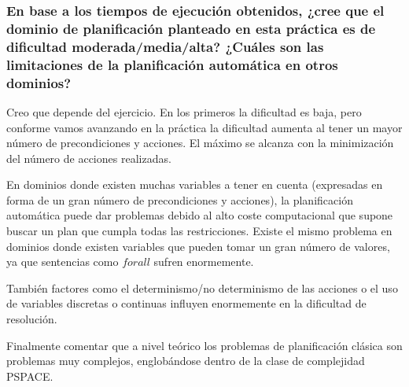 \documentclass[12pt]{article} %
\begin{document}
\subsubsection*{En base a los tiempos de ejecución obtenidos, ¿cree que el dominio de planificación planteado en esta práctica es de dificultad moderada/media/alta? ¿Cuáles son las limitaciones de la planificación automática en otros dominios?}

Creo que depende del ejercicio. En los primeros la dificultad es baja, pero conforme vamos avanzando en la práctica la dificultad aumenta al tener un mayor número de precondiciones y acciones. El máximo se alcanza con la minimización del número de acciones realizadas.

En dominios donde existen muchas variables a tener en cuenta (expresadas en forma de un gran número de precondiciones y acciones), la planificación automática puede dar problemas debido al alto coste computacional que supone buscar un plan que cumpla todas las restricciones. Existe el mismo problema en dominios donde existen variables que pueden tomar un gran número de valores, ya que sentencias como $forall$ sufren enormemente.

También factores como el determinismo/no determinismo de las acciones o el uso de variables discretas o continuas influyen enormemente en la dificultad de resolución.

Finalmente comentar que a nivel teórico los problemas de planificación clásica son problemas muy complejos, englobándose dentro de la clase de complejidad PSPACE.
\end{document}
